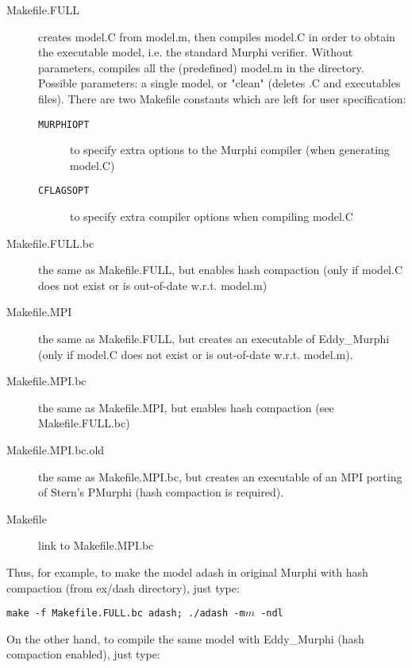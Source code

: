 \documentclass{article}
\begin{document}
\begin{description}

	\item[Makefile.FULL] creates model.C from model.m, then compiles model.C
in order to obtain the executable model, i.e. the standard Murphi verifier.
Without parameters, compiles all the (predefined) model.m in the directory.
Possible parameters: a single model, or "clean" (deletes .C and executables
files). There are two Makefile constants which are left for user specification:

	\begin{description}

		\item[{\tt MURPHIOPT}] to specify extra options to the Murphi
compiler (when generating model.C)

		\item[{\tt CFLAGSOPT}] to specify extra compiler options when
compiling model.C

	\end{description}

	\item[Makefile.FULL.bc] the same as Makefile.FULL, but enables hash
compaction (only if model.C does not exist or is out-of-date w.r.t. model.m)

	\item[Makefile.MPI] the same as Makefile.FULL, but creates an executable
of Eddy\_Murphi (only if model.C does not exist or is out-of-date w.r.t.
model.m).

	\item[Makefile.MPI.bc] the same as Makefile.MPI, but enables hash
compaction (see Makefile.FULL.bc)

	\item[Makefile.MPI.bc.old] the same as Makefile.MPI.bc, but creates an
executable of an MPI porting of Stern's PMurphi (hash compaction is required).

	\item[Makefile] link to Makefile.MPI.bc

\end{description}

Thus, for example, to make the model adash in original Murphi with hash
compaction (from ex/dash directory), just type:

{\tt make -f Makefile.FULL.bc adash; ./adash -m$m$ -ndl}

On the other hand, to compile the same model with Eddy\_Murphi (hash compaction
enabled), just type:
\end{document}
